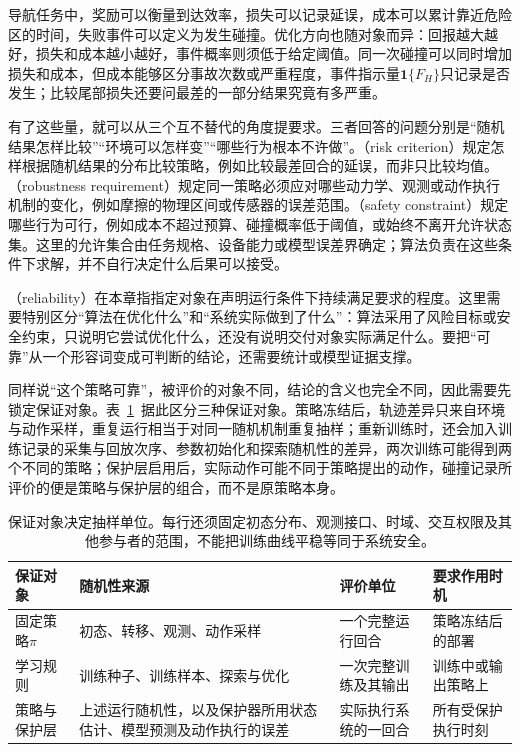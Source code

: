 导航任务中，奖励可以衡量到达效率，损失可以记录延误，成本可以累计靠近危险区的时间，失败事件可以定义为发生碰撞。优化方向也随对象而异：回报越大越好，损失和成本越小越好，事件概率则须低于给定阈值。同一次碰撞可以同时增加损失和成本，但成本能够区分事故次数或严重程度，事件指示量$\mathbf 1\{F_H\}$只记录是否发生；比较尾部损失还要问最差的一部分结果究竟有多严重。

有了这些量，就可以从三个互不替代的角度提要求。三者回答的问题分别是“随机结果怎样比较”“环境可以怎样变”“哪些行为根本不许做”。（risk criterion）规定怎样根据随机结果的分布比较策略，例如比较最差回合的延误，而非只比较均值。（robustness requirement）规定同一策略必须应对哪些动力学、观测或动作执行机制的变化，例如摩擦的物理区间或传感器的误差范围。（safety constraint）规定哪些行为可行，例如成本不超过预算、碰撞概率低于阈值，或始终不离开允许状态集。这里的允许集合由任务规格、设备能力或模型误差界确定；算法负责在这些条件下求解，并不自行决定什么后果可以接受。

（reliability）在本章指指定对象在声明运行条件下持续满足要求的程度。这里需要特别区分“算法在优化什么”和“系统实际做到了什么”：算法采用了风险目标或安全约束，只说明它尝试优化什么，还没有说明交付对象实际满足什么。要把“可靠”从一个形容词变成可判断的结论，还需要统计或模型证据支撑。

同样说“这个策略可靠”，被评价的对象不同，结论的含义也完全不同，因此需要先锁定保证对象。表~\ref{tab:rl-trustworthy-guarantee-objects}~据此区分三种保证对象。策略冻结后，轨迹差异只来自环境与动作采样，重复运行相当于对同一随机机制重复抽样；重新训练时，还会加入训练记录的采集与回放次序、参数初始化和探索随机性的差异，两次训练可能得到两个不同的策略；保护层启用后，实际动作可能不同于策略提出的动作，碰撞记录所评价的便是策略与保护层的组合，而不是原策略本身。

\begin{table}[htbp]
  \centering
  \begin{tabularx}{\linewidth}{@{}>{\raggedright\arraybackslash}p{20mm}XXX@{}}
    \toprule
    保证对象 & 随机性来源 & 评价单位 & 要求作用时机 \\
    \midrule
    固定策略$\pi$ & 初态、转移、观测、动作采样 & 一个完整运行回合 & 策略冻结后的部署 \\
    学习规则 & 训练种子、训练样本、探索与优化 & 一次完整训练及其输出 & 训练中或输出策略上 \\
    策略与保护层 & 上述运行随机性，以及保护器所用状态估计、模型预测及动作执行的误差 & 实际执行系统的一回合 & 所有受保护执行时刻 \\
    \bottomrule
  \end{tabularx}
  \caption{保证对象决定抽样单位。每行还须固定初态分布、观测接口、时域、交互权限及其他参与者的范围，不能把训练曲线平稳等同于系统安全。}
  \label{tab:rl-trustworthy-guarantee-objects}
\end{table}

